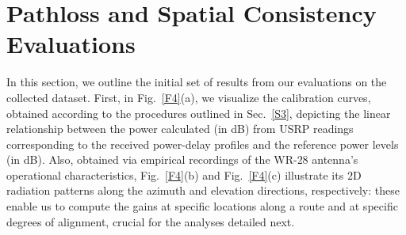 \documentclass[12pt, draftcls, onecolumn]{IEEEtran}
\begin{document}
\section{Pathloss and Spatial Consistency Evaluations}\label{S4}
In this section, we outline the initial set of results from our evaluations on the collected dataset. First, in Fig.~\ref{F4}(a), we visualize the calibration curves, obtained according to the procedures outlined in Sec.~\ref{S3}, depicting the linear relationship between the power calculated (in dB) from USRP readings corresponding to the received power-delay profiles and the reference power levels (in dB). Also, obtained via empirical recordings of the WR-$28$ antenna's operational characteristics, Fig.~\ref{F4}(b) and Fig.~\ref{F4}(c) illustrate its $2$D radiation patterns along the azimuth and elevation directions, respectively: these enable us to compute the gains at specific locations along a route and at specific degrees of alignment, crucial for the analyses detailed next.
\end{document}

